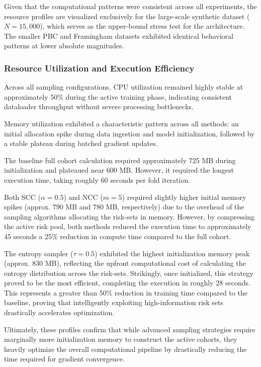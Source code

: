 \documentclass[a4paper,twoside,12pt]{report}
\begin{document}
Given that the computational patterns were consistent across all experiments, the resource profiles are visualized exclusively for the large-scale synthetic dataset ($N=15,000$), which serves as the upper-bound stress test for the architecture. The smaller PBC and Framingham datasets exhibited identical behavioral patterns at lower absolute magnitudes.

\subsubsection{Resource Utilization and Execution Efficiency}

Across all sampling configurations, CPU utilization remained highly stable at approximately 50\% during the active training phase, indicating consistent dataloader throughput without severe processing bottlenecks. 

Memory utilization exhibited a characteristic pattern across all methods: an initial allocation spike during data ingestion and model initialization, followed by a stable plateau during batched gradient updates. 

The baseline full cohort calculation required approximately 725 MB during initialization and plateaued near 600 MB. However, it required the longest execution time, taking roughly 60 seconds per fold iteration.

Both SCC ($\alpha=0.5$) and NCC ($m=5$) required slightly higher initial memory spikes (approx. 790 MB and 780 MB, respectively) due to the overhead of the sampling algorithms allocating the risk-sets in memory. However, by compressing the active risk pool, both methods reduced the execution time to approximately 45 seconds a 25\% reduction in compute time compared to the full cohort.

The entropy sampler ($\tau=0.5$) exhibited the highest initialization memory peak (approx. 830 MB), reflecting the upfront computational cost of calculating the entropy distribution across the risk-sets. Strikingly, once initialized, this strategy proved to be the most efficient, completing the execution in roughly 28 seconds. This represents a greater than 50\% reduction in training time compared to the baseline, proving that intelligently exploiting high-information risk sets drastically accelerates optimization.

Ultimately, these profiles confirm that while advanced sampling strategies require marginally more initialization memory to construct the active cohorts, they heavily optimize the overall computational pipeline by drastically reducing the time required for gradient convergence.
\end{document}
